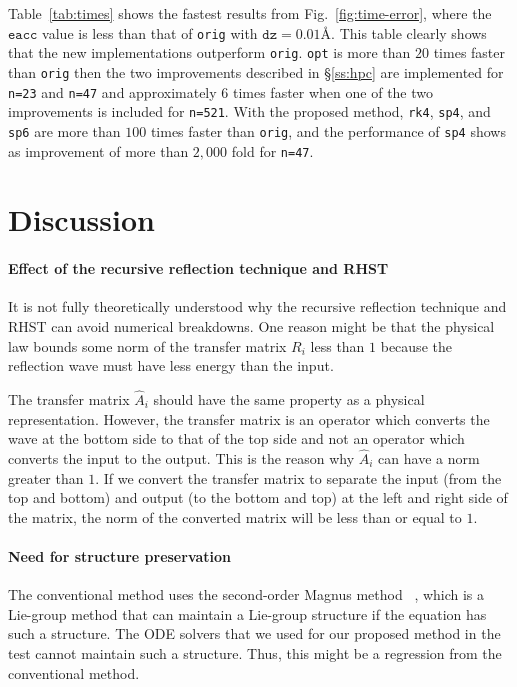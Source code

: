 \documentclass[preprint, 5p, times, sort&compress]{elsarticle}
\begin{document}
        Table~\ref{tab:times} shows the fastest results from Fig.~\ref{fig:time-error},
        where the $\mathtt{eacc}$ value is less than that of \texttt{orig} with $\mathtt{dz}=0.01\si{\angstrom}$.
        This table clearly shows that the new implementations outperform \texttt{orig}.
        \texttt{opt} is more than $20$ times faster than \texttt{orig} then the two improvements described in \S \ref{ss:hpc} are implemented
        for \texttt{n=23} and \texttt{n=47} and approximately $6$ times faster when one of the two improvements is included for \texttt{n=521}.
        With the proposed method, \texttt{rk4}, \texttt{sp4}, and \texttt{sp6} are more than $100$ times faster than \texttt{orig},
        and the performance of \texttt{sp4} shows as improvement of more than $2,000$ fold for \texttt{n=47}.

        \section{Discussion}
        \paragraph{Effect of the recursive reflection technique and RHST}
        It is not fully theoretically understood why the recursive reflection technique and RHST can avoid numerical breakdowns.
        One reason might be that the physical law bounds some norm of the transfer matrix $R_i$ less than $1$ because the reflection wave must have less energy than the input.

        The transfer matrix $\hat{A}_i$ should have the same property as a physical representation.
        However, the transfer matrix is an operator which converts the wave at the bottom side to that of the top side
        and not an operator which converts the input to the output.
        This is the reason why $\hat{A}_i$ can have a norm greater than $1$.
        If we convert the transfer matrix to separate the input (from the top and bottom) and output (to the bottom and top)
        at the left and right side of the matrix,
        the norm of the converted matrix will be less than or equal to $1$.

        \paragraph{Need for structure preservation}
        The conventional method uses the second-order Magnus method ~\cite{Blanes2008}, which is a Lie-group method that can maintain a Lie-group structure if the equation has such a structure.
        The ODE solvers that we used for our proposed method in the test cannot maintain such a structure.
        Thus, this might be a regression from the conventional method.
        
\end{document}
